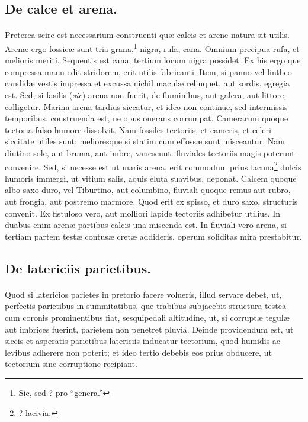 \documentclass[a4paper, 11pt, oneside, polutonikogreek, italian]{article}
\begin{document}
\subsection{De calce et arena.}
\paragraph{}
Preterea scire est necessarium construenti quæ calcis et arene natura sit utilis. Arenæ ergo fossicæ sunt tria grana,\footnote{Sic, sed ? pro ``genera.''} nigra, rufa, cana. Omnium precipua rufa, et melioris meriti. Sequentis est cana; tertium locum nigra possidet. Ex his ergo que compressa manu edit stridorem, erit utilis fabricanti. Item, si panno vel lintheo candidæ vestis impressa et excussa nichil maculæ relinquet, aut sordis, egregia est. Sed, si fasilis (\emph{sic}) arena non fuerit, de fluminibus, aut galera, aut littore, colligetur. Marina arena tardius siccatur, et ideo non continue, sed intermissis temporibus, construenda est, ne opus onerans corrumpat. Camerarum quoque tectoria falso humore dissolvit. Nam fossiles tectoriis, et cameris, et celeri siccitate utiles sunt; melioresque si statim cum effossæ sunt misceantur. Nam diutino sole, aut bruma, aut imbre, vanescunt: fluviales tectoriis magis poterunt convenire. Sed, si necesse est ut maris arena, erit commodum prius lacuna\footnote{? lacivia.} dulcis humoris immergi, ut vitium salis, aquis eluta suavibus, deponat. Calcem quoque albo saxo duro, vel Tiburtino, aut columbino, fluviali quoque remus aut rubro, aut frongia, aut postremo marmore. Quod erit ex spisso, et duro saxo, structuris convenit. Ex fistuloso vero, aut molliori lapide tectoriis adhibetur utilius. In duabus enim arenæ partibus calcis una miscenda est. In fluviali vero arena, si tertiam partem testæ contusæ cretæ addideris, operum soliditas mira prestabitur.

\subsection{De latericiis parietibus.}
\paragraph{}
Quod si latericios parietes in pretorio facere volueris, illud servare debet, ut, perfectis parietibus in summitatibus, que trabibus subjacebit structura testea cum coronis prominentibus fiat, sesquipedali altitudine, ut, si corruptæ tegulæ aut imbrices fuerint, parietem non penetret pluvia. Deinde providendum est, ut siccis et asperatis parietibus latericiis inducatur tectorium, quod humidis ac levibus adherere non poterit; et ideo tertio debebis eos prius obducere, ut tectorium sine corruptione recipiant.
\end{document}
